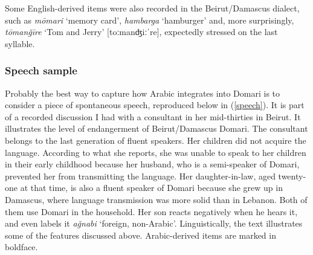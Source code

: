 \documentclass[output=paper]{langsci/langscibook}
\begin{document}
Some English-derived items were also recorded in the Beirut/Damascus dialect, such as \textit{mōmari} ‘memory card’, \textit{hambarga} ‘hamburger’ and, more surprisingly, \textit{tōman\v{g}īre} ‘Tom and Jerry’ [toːmanʤiːˈre], expectedly stressed on the last syllable.


 \subsubsection{Speech sample}

Probably the best way to capture how Arabic integrates into Domari is to consider a piece of spontaneous speech, reproduced below in (\ref{speech}). It is part of a recorded discussion I had with a consultant in her mid-thirties in Beirut. It illustrates the level of endangerment of Beirut/Damascus Domari. The consultant belongs to the last generation of fluent speakers. Her children did not acquire the language. According to what she reports, she was unable to speak to her children in their early childhood because her husband, who is a semi-speaker of Domari, prevented her from transmitting the language. Her daughter-in-law, aged twenty-one at that time, is also a fluent speaker of Domari because she grew up in Damascus, where language transmission was more solid than in Lebanon. Both of them use Domari in the household. Her son reacts negatively when he hears it, and even labels it \textit{a\v{g}nabi} ‘foreign, non-Arabic’. Linguistically, the text illustrates some of the features discussed above. Arabic-derived items are marked in boldface. 

\newpage
\end{document}
